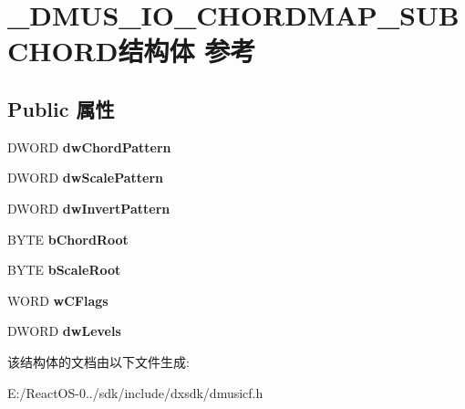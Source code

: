 \hypertarget{struct___d_m_u_s___i_o___c_h_o_r_d_m_a_p___s_u_b_c_h_o_r_d}{}\section{\+\_\+\+D\+M\+U\+S\+\_\+\+I\+O\+\_\+\+C\+H\+O\+R\+D\+M\+A\+P\+\_\+\+S\+U\+B\+C\+H\+O\+R\+D结构体 参考}
\label{struct___d_m_u_s___i_o___c_h_o_r_d_m_a_p___s_u_b_c_h_o_r_d}
\subsection*{Public 属性}
\begin{DoxyCompactItemize}
\item 
\mbox{\label{struct___d_m_u_s___i_o___c_h_o_r_d_m_a_p___s_u_b_c_h_o_r_d_a6b4d1aa9f280b60e13ee4d69ec4683ec}} 
D\+W\+O\+RD {\bfseries dw\+Chord\+Pattern}
\item 
\mbox{\label{struct___d_m_u_s___i_o___c_h_o_r_d_m_a_p___s_u_b_c_h_o_r_d_aaa49964414ef5ac4618ab0f9bfc61a0a}} 
D\+W\+O\+RD {\bfseries dw\+Scale\+Pattern}
\item 
\mbox{\label{struct___d_m_u_s___i_o___c_h_o_r_d_m_a_p___s_u_b_c_h_o_r_d_a49e4bbdda8d078f2a3c5eff045e157ce}} 
D\+W\+O\+RD {\bfseries dw\+Invert\+Pattern}
\item 
\mbox{\label{struct___d_m_u_s___i_o___c_h_o_r_d_m_a_p___s_u_b_c_h_o_r_d_a307074fd3d08717aab5209a543f43f9f}} 
B\+Y\+TE {\bfseries b\+Chord\+Root}
\item 
\mbox{\label{struct___d_m_u_s___i_o___c_h_o_r_d_m_a_p___s_u_b_c_h_o_r_d_addad8a889e4951a35cb47bc501acb185}} 
B\+Y\+TE {\bfseries b\+Scale\+Root}
\item 
\mbox{\label{struct___d_m_u_s___i_o___c_h_o_r_d_m_a_p___s_u_b_c_h_o_r_d_afa669157e5e46e0a23a4c3e9422bdd4c}} 
W\+O\+RD {\bfseries w\+C\+Flags}
\item 
\mbox{\label{struct___d_m_u_s___i_o___c_h_o_r_d_m_a_p___s_u_b_c_h_o_r_d_af51ff22467eda9c0834e5577c65db952}} 
D\+W\+O\+RD {\bfseries dw\+Levels}
\end{DoxyCompactItemize}


该结构体的文档由以下文件生成\+:\begin{DoxyCompactItemize}
\item 
E\+:/\+React\+O\+S-\/0../sdk/include/dxsdk/dmusicf.\+h\end{DoxyCompactItemize}
